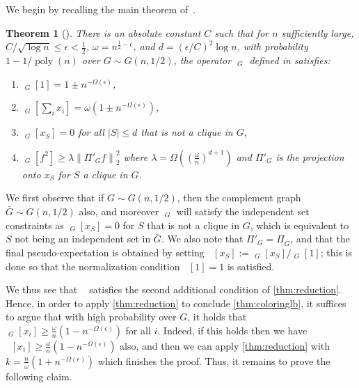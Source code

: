 \documentclass[10pt,a4paper]{article}
\newtheorem{theorem}{Theorem}
\theoremstyle{definition}
\DeclareMathOperator{\poly}{poly}
\newcommand{\eps}{\epsilon}
\DeclareMathOperator{\pE}{\tilde{\mathbb{E}}}
\def\abs#1{\left|#1  \right|}
\def\norm#1{\left\| #1 \right\|}
\begin{document}
We begin by recalling the main theorem of~\cite{DBLP:conf/focs/BarakHKKMP16}. 
\begin{theorem}[\cite{DBLP:conf/focs/BarakHKKMP16}]
There is an absolute constant $C$ such that for $n$ sufficiently large, $C /\sqrt{\log n} \leq \eps < \frac{1}{2}$, $\omega = n^{\frac{1}{2} - \eps}$, and $d = (\eps/C)^2 \log n$,  with probability $1 - 1/\poly(n)$ over $G \sim G(n,1/2)$, the operator $\pE_{G}$ defined in \cite{DBLP:conf/focs/BarakHKKMP16} satisfies:
\begin{enumerate}
\item $\pE_G[1] = 1 \pm n^{-\Omega(\eps)}$,
\item $\pE_G[ \sum_{i} x_i] = \omega (1 \pm n^{-\Omega(\eps)})$,
\item $\pE_G[x_S] = 0$ for all $\abs{S} \leq d$ that is not a clique in $G$,
\item $\pE_G[f^2] \geq \lambda \norm{\Pi'_G f}_2^2$ where $\lambda = \Omega\left(\left(\frac{\omega}{n} \right)^{d + 1}\right)$ and $\Pi'_G$ is the projection onto $x_S$ for $S$ a clique in $G$.
\end{enumerate}
\end{theorem}
We first observe that if $G \sim G(n,1/2)$, then the complement graph $\bar{G} \sim G(n,1/2)$ also, and moreover $\pE_G$ will satisfy the independent set constraints as $\pE_G[x_S] = 0$ for $S$ that is not a clique in $G$, which is equivalent to $S$ not being an independent set in $\bar{G}$. We also note that $\Pi'_G = \Pi_{\bar{G}}$, and that the final pseudo-expectation is obtained by setting $\pE[x_S] := \pE_G[x_S]/\pE_G[1]$; this is done so that the normalization condition $\pE[1] = 1$ is satisfied. 

We thus see that $\pE$ satisfies the second additional condition of \cref{thm:reduction}. Hence, in order to apply \cref{thm:reduction} to conclude \cref{thm:coloringlb}, it suffices to argue that with high probability over $G$, it holds that $\pE_G[x_i] \geq \frac{\omega}{n}(1 - n^{-\Omega(\eps)})$ for all $i$. Indeed, if this holds then we have $\pE[x_i] \geq \frac{\omega}{n} (1 - n^{-\Omega(\eps)})$ also, and then we can apply \cref{thm:reduction} with $k = \frac{n}{\omega} (1 + n^{-\Omega(\eps)})$ which finishes the proof. Thus, it remains to prove the following claim.
\end{document}
